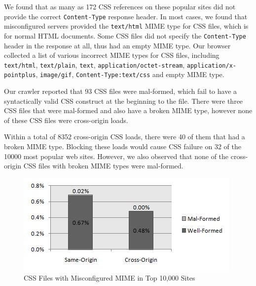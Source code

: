 \documentclass{acm_proc_article-sp}
\begin{document}
We found that as many as 172 CSS references on these popular sites did not provide the correct \texttt{Content-Type} response header. In most cases, we found that misconfigured servers provided the \texttt{text/html} MIME type for CSS files, which is for normal HTML documents. Some CSS files did not specify the \texttt{Content-Type} header in the response at all, thus had an empty MIME type. Our browser collected a list of various incorrect MIME types for CSS files, including \texttt{text/html}, \texttt{text/plain}, \texttt{text}, \texttt{application/octet-stream}, \texttt{application/x-pointplus}, \texttt{image/gif}, \texttt{Content-Type:text/css} and empty MIME type.

Our crawler reported that 93 CSS files were mal-formed, which fail to have a syntactically valid CSS construct at the beginning to the file. There were three CSS files that were mal-formed and also have a broken MIME type, however none of these CSS files were cross-origin loads.

Within a total of 8352 cross-origin CSS loads, there were 40 of them that had a broken MIME type. Blocking these loads would cause CSS failure on 32 of the 10000 most popular web sites. However, we also observed that none of the cross-origin CSS files with broken MIME types were mal-formed.


\begin{figure}
\centering
\includegraphics[width=\linewidth]{mime.jpg}
\caption{CSS Files with Misconfigured MIME in Top 10,000 Sites}
\label{table:MIME}
\end{figure}
\end{document}
